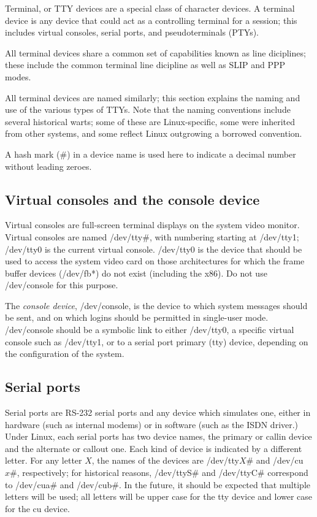 Terminal, or TTY devices are a special class of character devices.  A
terminal device is any device that could act as a controlling terminal
for a session; this includes virtual consoles, serial ports, and
pseudoterminals (PTYs).

All terminal devices share a common set of capabilities known as line
diciplines; these include the common terminal line dicipline as well
as SLIP and PPP modes.

All terminal devices are named similarly; this section explains the
naming and use of the various types of TTYs.  Note that the naming
conventions include several historical warts; some of these are
Linux-specific, some were inherited from other systems, and some
reflect Linux outgrowing a borrowed convention.

A hash mark ($\#$) in a device name is used here to indicate a decimal
number without leading zeroes.

\subsection{Virtual consoles and the console device}

Virtual consoles are full-screen terminal displays on the system video
monitor.  Virtual consoles are named {\file /dev/tty$\#$}, with
numbering starting at {\file /dev/tty1}; {\file /dev/tty0} is the
current virtual console.  {\file /dev/tty0} is the device that should
be used to access the system video card on those architectures for
which the frame buffer devices ({\file /dev/fb*}) do not exist
(including the x86).  Do not use {\file /dev/console} for this
purpose.

The {\em console device\/}, {\file /dev/console}, is the device to
which system messages should be sent, and on which logins should be
permitted in single-user mode.  {\file /dev/console} should be a
symbolic link to either {\file /dev/tty0}, a specific virtual console
such as {\file /dev/tty1}, or to a serial port primary ({\file tty})
device, depending on the configuration of the system.

\subsection{Serial ports}

Serial ports are RS-232 serial ports and any device which simulates
one, either in hardware (such as internal modems) or in software (such
as the ISDN driver.)  Under Linux, each serial ports has two device
names, the primary or callin device and the alternate or callout one.
Each kind of device is indicated by a different letter.  For any
letter $X$, the names of the devices are {\file /dev/tty${X\#}$} and
{\file /dev/cu${x\#}$}, respectively; for historical reasons, {\file
/dev/ttyS$\#$} and {\file /dev/ttyC$\#$} correspond to {\file
/dev/cua$\#$} and {\file /dev/cub$\#$}.  In the future, it should be
expected that multiple letters will be used; all letters will be upper
case for the {\file tty} device and lower case for the {\file cu}
device.

